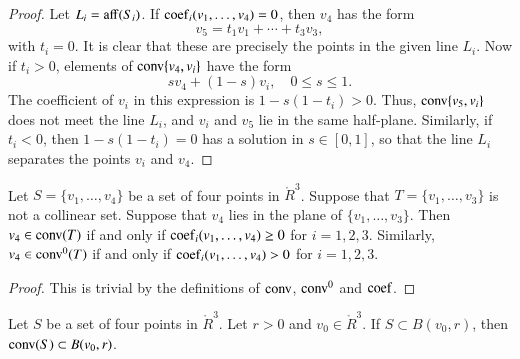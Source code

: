 \begin{tarskidata}
\begin{tarski}
\begin{proof}
  Let $L_i ={\operatorname{aff}}(S_i)$.
If ${\operatorname{coef}}_i(v_1,\ldots,v_4)=0$, then $v_4$
has the form
	$$
	v_5 = t_1 v_1 + \cdots + t_3 v_3,
	$$
with $t_i=0$.  It is clear that these are
precisely the points in the given line $L_i$.
Now if $t_i>0$,
elements of
${\operatorname{conv}}\{v_4,v_i\}$ have the form
	$$s v_4 + (1-s) v_i,\quad 0\le s \le 1.$$
The coefficient of $v_i$ in this expression
is $1-s(1-t_i)>0$.  Thus, ${\operatorname{conv}}\{v_5,v_i\}$
does not meet the line $L_i$, and $v_i$ and $v_5$
lie in the same half-plane.  Similarly,
if $t_i<0$, then $1-s(1-t_i)=0$ has a solution
in $s\in[0,1]$, so that the line $L_i$ separates the
points $v_i$ and $v_4$.
\end{proof}
\end{tarski}




\begin{tarski}

\begin{lemma}
Let $S=\{v_1,\ldots,v_4\}$ be
a set of four points in $\ring{R}^3$.  Suppose
that $T=\{v_1,\ldots,v_3\}$ is not a collinear
set. 
Suppose that $v_4$ lies in the plane of
$\{v_1,\ldots,v_3\}$.  
 Then $v_4\in{\operatorname{conv}}(T)$ if and only
if  
${\operatorname{coef}}_i(v_1,\ldots,v_4)\ge0$ 
for $i=1,2,3$.
Similarly, $v_4\in{\operatorname{conv}}^0(T)$ if and only
if  
${\operatorname{coef}}_i(v_1,\ldots,v_4)>0$ 
for $i=1,2,3$.
\end{lemma}

\begin{proof}  This is trivial by the definitions
of ${\operatorname{conv}}$, ${\operatorname{conv}}^0$ and ${\operatorname{coef}}$.
\end{proof}
\end{tarski}





\begin{tarski}

\begin{lemma}
Let $S$ be a set of four points in $\ring{R}^3$.
Let $r>0$ and $v_0\in\ring{R}^3$.  If $S\subset B(v_0,r)$, then
${\operatorname{conv}}(S)\subset B(v_0,r)$.
\end{lemma}


\end{tarski}
\end{tarskidata}
